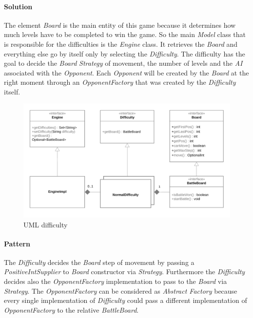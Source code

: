 \documentclass[12pt, a4paper]{report}
\theoremstyle{definition}
\begin{document}
            \paragraph{Solution}

            The element \emph{Board} is the main entity of this game because it determines how much
            levels have to be completed to win the game. So the main \emph{Model} class that is responsible for
            the difficulties is the \emph{Engine} class. It retrieves the \emph{Board} and everything else go by itself
            only by selecting the \emph{Difficulty}. The difficulty has the goal to decide the \emph{Board} \emph{Strategy} of
            movement, the number of levels and the \emph{AI} associated with the \emph{Opponent}. Each \emph{Opponent} will
            be created by the \emph{Board} at the right moment through an \emph{OpponentFactory} that was created by the \emph{Difficulty}
            itself.

            \begin{figure}[ht]
            \centering{}
            \includegraphics[width=\textwidth]{difficulty}
            \caption{UML difficulty}
            \end{figure}

            \paragraph{Pattern}

            The \emph{Difficulty} decides the \emph{Board} step of movement by passing a \emph{PositiveIntSupplier} to \emph{Board} constructor via \emph{Strategy}.
            Furthermore the \emph{Difficulty} decides also the \emph{OpponentFactory} implementation to pass to the \emph{Board} via \emph{Strategy}.
            The \emph{OpponentFactory} can be considered as \emph{Abstract Factory} because every single implementation of \emph{Difficulty} could pass
            a different implementation of \emph{OpponentFactory} to the relative \emph{BattleBoard}.
            
\end{document}
